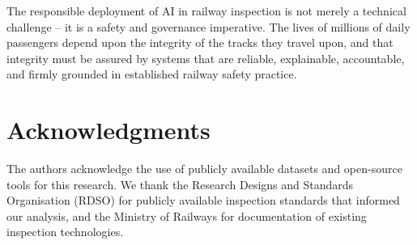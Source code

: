\documentclass[conference]{IEEE}
\begin{document}
The responsible deployment of AI in railway inspection is not merely a technical challenge -- it is a safety and governance imperative. The lives of millions of daily passengers depend upon the integrity of the tracks they travel upon, and that integrity must be assured by systems that are reliable, explainable, accountable, and firmly grounded in established railway safety practice.

\section*{Acknowledgments}
The authors acknowledge the use of publicly available datasets and open-source tools for this research. We thank the Research Designs and Standards Organisation (RDSO) for publicly available inspection standards that informed our analysis, and the Ministry of Railways for documentation of existing inspection technologies.


\end{document}
